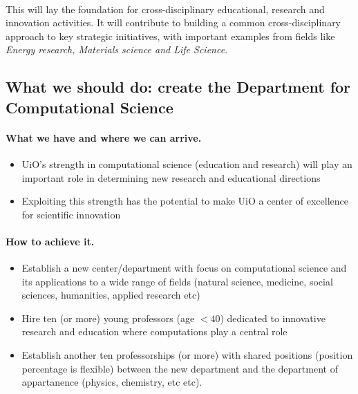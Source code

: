 \documentclass[%
twoside,                 %
final,                   %
10pt]{article}
\begin{document}
\paragraph{}
This will lay the foundation for cross-disciplinary
educational, research and innovation activities. It will contribute to building a common cross-disciplinary
approach to key strategic initiatives, with important examples from fields like  \emph{Energy research, Materials science and  Life Science}.











\subsection*{What we should do: create the Department  for Computational Science}

\paragraph{What we have and where we can arrive.}
\begin{itemize}
\item UiO's strength in computational science (education and research) will play an important role in  determining new research and educational directions

\item Exploiting this strength has the potential to make UiO a center of excellence for scientific innovation
\end{itemize}

\noindent




\paragraph{How to achieve it.}
\begin{itemize}
\item Establish  a new center/department with focus on computational science and its applications to a wide range of fields (natural science, medicine, social sciences, humanities, applied research etc)

\item Hire ten (or more) young professors (age $< 40$) dedicated to innovative research and education where computations play a central role

\item Establish another ten professorships (or more) with  shared positions (position percentage  is flexible) between the  new department and the department of appartanence (physics, chemistry, etc etc).
\end{itemize}
\end{document}
